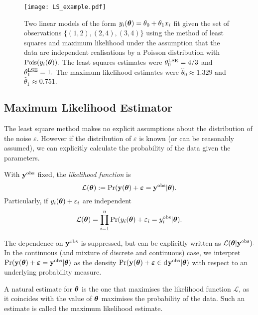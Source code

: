 \begin{figure}[htbp]
    \centering
    \texttt{[image: LS\_example.pdf]}
    \caption{
        Two linear models of the form
        $y_i(\bm{\theta}) = \theta_0 + \theta_1x_i$ fit given the set
        of observations $\{(1, 2), (2, 4), (3, 4)\}$ using the method of
        least squares and maximum likelihood under
        the assumption that the data are independent realisations by a Poisson
        distribution with $\operatorname{Pois}(y_i(\bm{\theta})).$ The least squares estimates
        were $\theta^{\mathrm{LSE}}_0 = 4/3$ and $\theta^{\mathrm{LSE}}_1 = 1.$ The maximum likelihood
        estimates were $\hat{\theta}_0 \approx 1.329$ and
        $\hat{\theta}_1 \approx 0.751.$
    }
    \label{fig:LSE}
\end{figure}

\subsection*{Maximum Likelihood Estimator}

The least square method makes no explicit assumptions about the distribution
of the noise $\varepsilon.$ However if the distribution of $\varepsilon$ is
known (or can be reasonably assumed), we can
explicitly calculate the probability of the data given the parameters.

\begin{definition}
    With $\mathbf{y}^{\mathrm{obs}}$ fixed, the \emph{likelihood function} is
    $$
        \mathcal{L}(\bm{\theta})
        := \Pr(
        \mathbf{y}(\bm{\theta}) + \bm{\varepsilon} = \mathbf{y}^{\mathrm{obs}}
        | \bm{\theta}
        ).
    $$
    Particularly, if $y_i(\bm{\theta}) + \varepsilon_i$ are independent
    $$
        \mathcal{L}(\bm{\theta})
        = \prod_{i = 1}^n
        \Pr(
        y_i(\bm{\theta}) + \varepsilon_i = y_i^{\mathrm{obs}}
        | \bm{\theta}
        ).
    $$
\end{definition}

The dependence on $\mathbf{y}^{\mathrm{obs}}$ is suppressed, but can be
explicitly written as $\mathcal{L}(\bm{\theta}|\mathbf{y}^{\mathrm{obs}}).$ In the continuous
(and mixture of discrete and continuous) case, 
we interpret
$
    \Pr(
    \mathbf{y}(\bm{\theta}) + \bm{\varepsilon} = \mathbf{y}^{\mathrm{obs}}
    | \bm{\theta}
    )
$
as the density
$
    \Pr(
    \by(\btheta) + \bm{\varepsilon} \in \diff\by^\obs
    | \btheta
    )
$ with respect to an underlying probability measure.

A natural estimate for $\bm{\theta}$ is the one that maximises the likelihood
function $\mathcal{L}$, as it coincides with the value of $\bm{\theta}$ maximises the
probability of the data. Such an estimate is called the maximum likelihood
estimate.

